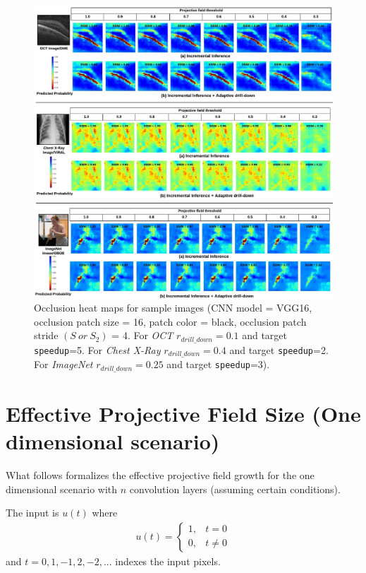 \begin{figure}[t]
\includegraphics[width=\textwidth]{images/visual_examples}
\caption{Occlusion heat maps for sample images (CNN model = VGG16, occlusion patch size = 16, patch color = black, occlusion patch stride $(S~or~S_2)$ = 4. For \textit{OCT} $r_{drill\_down}=0.1$ and target \texttt{speedup}=5. For \textit{Chest X-Ray} $r_{drill\_down}=0.4$ and target \texttt{speedup}=2. For \textit{ImageNet} $r_{drill\_down}=0.25$ and target \texttt{speedup}=3).}
\label{fig:visual_examples}
\end{figure}


\section{Effective Projective Field Size (One dimensional scenario)}

What follows formalizes the effective projective field growth for the one dimensional scenario with $n$ convolution layers (assuming certain conditions).

The input is $u(t)$ where
\begin{align}
	u(t) = 
	\begin{cases}
		1, & t = 0\\
		0, & t \neq 0 
	\end{cases}
\end{align}
and $t = 0, 1, -1, 2, -2, ...$ indexes the input pixels.

